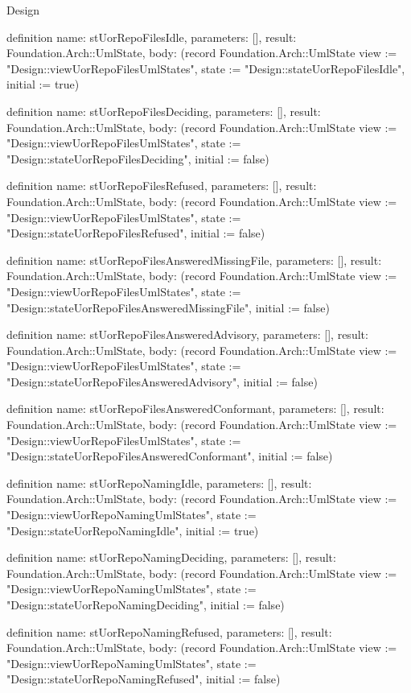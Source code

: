 \begin{lexlean}{Design}
\begin{semanticmodule}
definition{
  name: stUorRepoFilesIdle,
  parameters: [],
  result: Foundation.Arch::UmlState,
  body: (record Foundation.Arch::UmlState {view := "Design::viewUorRepoFilesUmlStates", state := "Design::stateUorRepoFilesIdle", initial := true})
}

definition{
  name: stUorRepoFilesDeciding,
  parameters: [],
  result: Foundation.Arch::UmlState,
  body: (record Foundation.Arch::UmlState {view := "Design::viewUorRepoFilesUmlStates", state := "Design::stateUorRepoFilesDeciding", initial := false})
}

definition{
  name: stUorRepoFilesRefused,
  parameters: [],
  result: Foundation.Arch::UmlState,
  body: (record Foundation.Arch::UmlState {view := "Design::viewUorRepoFilesUmlStates", state := "Design::stateUorRepoFilesRefused", initial := false})
}

definition{
  name: stUorRepoFilesAnsweredMissingFile,
  parameters: [],
  result: Foundation.Arch::UmlState,
  body: (record Foundation.Arch::UmlState {view := "Design::viewUorRepoFilesUmlStates", state := "Design::stateUorRepoFilesAnsweredMissingFile", initial := false})
}

definition{
  name: stUorRepoFilesAnsweredAdvisory,
  parameters: [],
  result: Foundation.Arch::UmlState,
  body: (record Foundation.Arch::UmlState {view := "Design::viewUorRepoFilesUmlStates", state := "Design::stateUorRepoFilesAnsweredAdvisory", initial := false})
}

definition{
  name: stUorRepoFilesAnsweredConformant,
  parameters: [],
  result: Foundation.Arch::UmlState,
  body: (record Foundation.Arch::UmlState {view := "Design::viewUorRepoFilesUmlStates", state := "Design::stateUorRepoFilesAnsweredConformant", initial := false})
}

definition{
  name: stUorRepoNamingIdle,
  parameters: [],
  result: Foundation.Arch::UmlState,
  body: (record Foundation.Arch::UmlState {view := "Design::viewUorRepoNamingUmlStates", state := "Design::stateUorRepoNamingIdle", initial := true})
}

definition{
  name: stUorRepoNamingDeciding,
  parameters: [],
  result: Foundation.Arch::UmlState,
  body: (record Foundation.Arch::UmlState {view := "Design::viewUorRepoNamingUmlStates", state := "Design::stateUorRepoNamingDeciding", initial := false})
}

definition{
  name: stUorRepoNamingRefused,
  parameters: [],
  result: Foundation.Arch::UmlState,
  body: (record Foundation.Arch::UmlState {view := "Design::viewUorRepoNamingUmlStates", state := "Design::stateUorRepoNamingRefused", initial := false})
}


\end{semanticmodule}
\end{lexlean}
